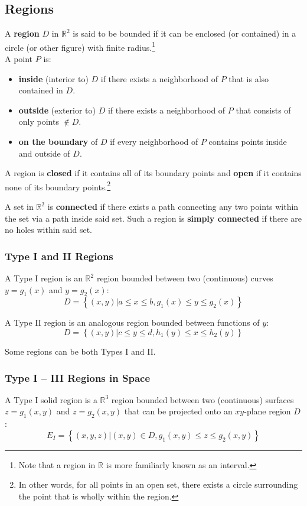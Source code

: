 \documentclass{article}
\begin{document}
\subsection{Regions} \label{regions}
A \textbf{region} $D$ in $\mathbb{R}^2$ is said to be bounded if it can be enclosed (or contained) in a circle (or other figure) with finite radius.\footnote{Note that a region in $\mathbb{R}$ is more familiarly known as an interval.}\\
A point $P$ is:
\begin{itemize}
    \item \textbf{inside} (interior to) $D$ if there exists a neighborhood of $P$ that is also contained in $D$.
    \item \textbf{outside} (exterior to) $D$ if there exists a neighborhood of $P$ that consists of only points $\notin D$.
    \item \textbf{on the boundary} of $D$ if every neighborhood of $P$ contains points inside and outside of $D$.
\end{itemize}
A region is \textbf{closed} if it contains all of its boundary points and \textbf{open} if it contains none of its boundary points.\footnote{In other words, for all points in an open set, there exists a circle surrounding the point that is wholly within the region.}

A set in $\mathbb{R}^2$ is \textbf{connected} if there exists a path connecting any two points within the set via a path inside said set. Such a region is \textbf{simply connected} if there are no holes within said set.

\subsubsection{Type I and II Regions}
A Type I region is an $\mathbb{R}^2$ region bounded between two (continuous) curves $y=g_1(x)$ and $y=g_2(x)$:
$$D=\left\{(x,y)|a\le x\le b, g_1(x)\le y\le g_2(x)\right\}$$

A Type II region is an analogous region bounded between functions of $y$:
$$D=\left\{(x,y)|c\le y\le d, h_1(y)\le x\le h_2(y)\right\}$$

Some regions can be both Types I and II.

\subsubsection{Type I -- III Regions in Space}
A Type I solid region is a $\mathbb{R}^3$ region bounded between two (continuous) surfaces $z=g_1(x,y)$ and $z=g_2(x,y)$ that can be projected onto an $xy$-plane region $D$:
$$E_I=\left\{(x,y,z)|(x,y)\in D, g_1(x,y)\le z \le g_2(x,y)\right\}$$
\end{document}
